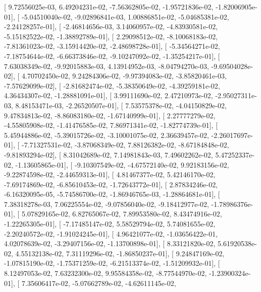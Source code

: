 \documentclass{article}
\begin{document}
       [  9.72556025e-03,   6.49204231e-02,  -7.56362805e-02,
         -1.95721836e-02,  -1.82006905e-01],
       [ -5.04510040e-02,  -9.02896841e-03,   1.00886851e-02,
         -5.04685381e-02,  -2.24128257e-01],
       [ -2.46814656e-03,   3.14060957e-02,  -4.83930581e-02,
         -5.15182522e-02,  -1.38892789e-01],
       [  2.29098512e-02,  -8.10068183e-02,  -7.81361023e-02,
         -3.15914420e-02,  -2.48698728e-01],
       [ -5.34564271e-02,  -7.18754644e-02,  -6.66373846e-02,
         -9.10247092e-02,  -1.35254217e-01],
       [  7.63038349e-02,  -9.92015883e-03,   4.13914952e-03,
         -8.04794270e-03,  -9.69504028e-02],
       [  4.70702450e-02,   9.24284306e-02,  -9.97394083e-02,
         -3.85820461e-03,  -7.57629099e-02],
       [ -2.81682474e-02,  -5.38350649e-02,  -4.39259181e-02,
          4.36434307e-02,  -1.28881091e-01],
       [  3.99111690e-02,   2.47210973e-02,  -2.95027311e-03,
          8.48153471e-03,  -2.26520507e-01],
       [  7.53575378e-02,  -4.04150829e-02,   9.47834813e-02,
         -8.86083180e-02,  -1.67140999e-01],
       [  2.27777279e-02,  -4.55805908e-02,  -1.41476585e-02,
          7.86971341e-02,  -1.82774739e-01],
       [  5.45944886e-02,  -5.39015726e-02,  -3.10001075e-02,
          2.36639457e-02,  -2.26017697e-01],
       [ -7.71327531e-02,  -3.87068349e-02,   7.88126382e-02,
         -8.67184848e-02,  -9.81893294e-02],
       [  8.31042689e-02,   7.14981843e-03,   7.49602262e-02,
          5.47252337e-02,  -1.13605865e-01],
       [ -9.10307549e-02,  -4.67572140e-02,   9.92183156e-02,
         -9.22874598e-02,  -2.44659313e-01],
       [  4.81467377e-02,   5.42146170e-02,  -7.69174869e-02,
         -6.85610453e-02,  -1.72643772e-01],
       [  2.87834246e-02,  -6.16320095e-05,  -5.74586700e-02,
         -1.86946765e-03,  -1.28864681e-01],
       [  7.38318278e-03,   7.06225554e-02,  -9.07856040e-02,
         -9.18412977e-02,  -1.78986376e-01],
       [  5.07829165e-02,   6.82765067e-02,   7.89953580e-02,
          8.43474916e-02,  -1.22265305e-01],
       [ -7.17485147e-02,   5.58529794e-02,   5.74081655e-02,
         -2.20240572e-02,  -1.91024245e-01],
       [  4.96421077e-02,  -1.03656422e-01,   4.02078639e-02,
         -3.29407156e-02,  -1.13700898e-01],
       [  8.33121820e-02,   5.61920538e-02,   4.55132138e-02,
          7.31119296e-02,  -1.86850237e-01],
       [  9.24847169e-02,  -1.07815190e-02,  -1.75371259e-02,
         -6.21513374e-02,  -1.51209932e-01],
       [  8.12497053e-02,   7.63232300e-02,   9.95584358e-02,
         -8.77544970e-02,  -1.23900324e-01],
       [  7.35606417e-02,  -5.07662789e-02,  -4.62611145e-02,
\end{document}
